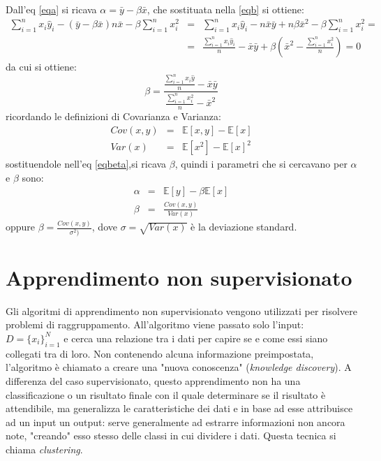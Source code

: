 \documentclass[a4paper,12pt,oneside]{book}
\begin{document}
Dall'eq \ref{eqa} si ricava $\alpha=\bar{y}-\beta \bar{x}$, che sostituata nella \ref{eqb} si ottiene:
\begin{eqnarray}
\sum_{i=1}^{n}x_{i}\hat{y}_{i}- (\bar{y}-\beta \bar{x}) n \bar{x} - \beta \sum_{i=1}^{n}x_{i}^2&=&\sum_{i=1}^{n}x_{i}\hat{y}_{i}- n \bar{x} \bar{y}+n \beta \bar{x}^2 - \beta \sum_{i=1}^{n}x_{i}^2=\nonumber \\
&= &\frac{\sum_{i=1}^{n}x_{i}\hat{y}_{i}}{n}- \bar{x} \bar{y}+\beta (\bar{x}^2 -\frac{ \sum_{i=1}^{n}x_{i}^2}{n})=0 \nonumber
\end{eqnarray}
da cui si ottiene:
\begin{equation}\label{eqbeta}
\beta=\frac{\frac{\sum_{i=1}^{n}x_i \hat{y}}{n}-\bar{x}\bar{y}}{\frac{\sum_{i=1}^{n}x_{i}^2}{n}-\bar{x}^2}
\end{equation}
ricordando le definizioni di Covarianza e Varianza: 
\begin{eqnarray}
Cov(x,y)&=&\mathbb{E}[x,y]-\mathbb{E}[x]\\
Var(x)&=&\mathbb{E}[x^2]-\mathbb{E}[x]^2
\end{eqnarray}
sostituendole nell'eq \ref{eqbeta},si ricava $\beta$, quindi i parametri che si cercavano per $\alpha$ e $\beta$ sono:
\begin{eqnarray}
\alpha &=&\mathbb{E}[y]-\beta \mathbb{E}[x]\\
\beta &=&\frac{Cov(x,y)}{Var(x)}
\end{eqnarray}
oppure $\beta=\frac{Cov(x,y)}{\sigma^2)}$, dove $\sigma=\sqrt{Var(x)}$ \`e la deviazione standard.

\section{Apprendimento non supervisionato}
Gli algoritmi di apprendimento non supervisionato vengono utilizzati per risolvere problemi di raggruppamento.
All'algoritmo viene passato solo l'input: $D={\{ x_{i}\}}^{N}_{i=1}$ e cerca una relazione tra i dati per capire se e come essi siano collegati tra di loro. Non contenendo alcuna informazione preimpostata, l'algoritmo \`e chiamato a creare una "nuova conoscenza" (\textit{knowledge discovery}). A differenza del caso supervisionato, questo apprendimento non ha una classificazione o un risultato finale con il quale determinare se il risultato \`e attendibile, ma generalizza le caratteristiche dei dati e in base ad esse attribuisce ad un input un output: serve generalmente ad estrarre informazioni non ancora note, "creando" esso stesso delle classi in cui dividere i dati. Questa tecnica si chiama \textit{clustering}.
\end{document}
